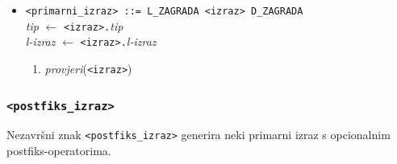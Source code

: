 \documentclass[times, 12pt, utf8]{book}
\begin{document}
\begin{itemize}
\item
\verb|<primarni_izraz> ::= L_ZAGRADA <izraz> D_ZAGRADA|\\
\emph{tip} \(\leftarrow\) \verb|<izraz>.|\emph{tip}\\
\emph{l-izraz} \(\leftarrow\) \verb|<izraz>.|\emph{l-izraz}
\begin{enumerate}
\item
\emph{provjeri}(\verb|<izraz>|)
\end{enumerate}

\end{itemize}

\subsubsection{\texttt{<postfiks\_izraz>}}

Nezavršni znak \verb|<postfiks_izraz>| generira neki primarni izraz s opcionalnim postfiks-operatorima.
\end{document}
